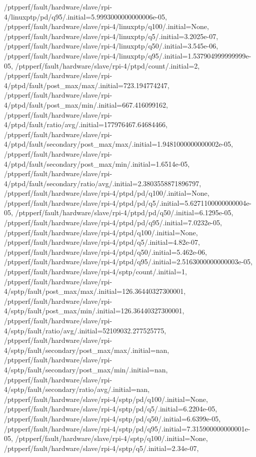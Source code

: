{    /ptpperf/fault/hardware/slave/rpi-4/linuxptp/pd/q95/.initial=5.9993000000000006e-05,
    /ptpperf/fault/hardware/slave/rpi-4/linuxptp/q100/.initial=None,
    /ptpperf/fault/hardware/slave/rpi-4/linuxptp/q5/.initial=3.2025e-07,
    /ptpperf/fault/hardware/slave/rpi-4/linuxptp/q50/.initial=3.545e-06,
    /ptpperf/fault/hardware/slave/rpi-4/linuxptp/q95/.initial=1.537904999999999e-05,
    /ptpperf/fault/hardware/slave/rpi-4/ptpd/count/.initial=2,
    /ptpperf/fault/hardware/slave/rpi-4/ptpd/fault/post_max/max/.initial=723.194774247,
    /ptpperf/fault/hardware/slave/rpi-4/ptpd/fault/post_max/min/.initial=667.416099162,
    /ptpperf/fault/hardware/slave/rpi-4/ptpd/fault/ratio/avg/.initial=177976467.64684466,
    /ptpperf/fault/hardware/slave/rpi-4/ptpd/fault/secondary/post_max/max/.initial=1.9481000000000002e-05,
    /ptpperf/fault/hardware/slave/rpi-4/ptpd/fault/secondary/post_max/min/.initial=1.6514e-05,
    /ptpperf/fault/hardware/slave/rpi-4/ptpd/fault/secondary/ratio/avg/.initial=2.3803558871896797,
    /ptpperf/fault/hardware/slave/rpi-4/ptpd/pd/q100/.initial=None,
    /ptpperf/fault/hardware/slave/rpi-4/ptpd/pd/q5/.initial=5.6271100000000004e-05,
    /ptpperf/fault/hardware/slave/rpi-4/ptpd/pd/q50/.initial=6.1295e-05,
    /ptpperf/fault/hardware/slave/rpi-4/ptpd/pd/q95/.initial=7.0232e-05,
    /ptpperf/fault/hardware/slave/rpi-4/ptpd/q100/.initial=None,
    /ptpperf/fault/hardware/slave/rpi-4/ptpd/q5/.initial=4.82e-07,
    /ptpperf/fault/hardware/slave/rpi-4/ptpd/q50/.initial=5.462e-06,
    /ptpperf/fault/hardware/slave/rpi-4/ptpd/q95/.initial=2.5163000000000003e-05,
    /ptpperf/fault/hardware/slave/rpi-4/sptp/count/.initial=1,
    /ptpperf/fault/hardware/slave/rpi-4/sptp/fault/post_max/max/.initial=126.36440327300001,
    /ptpperf/fault/hardware/slave/rpi-4/sptp/fault/post_max/min/.initial=126.36440327300001,
    /ptpperf/fault/hardware/slave/rpi-4/sptp/fault/ratio/avg/.initial=52109032.277525775,
    /ptpperf/fault/hardware/slave/rpi-4/sptp/fault/secondary/post_max/max/.initial=nan,
    /ptpperf/fault/hardware/slave/rpi-4/sptp/fault/secondary/post_max/min/.initial=nan,
    /ptpperf/fault/hardware/slave/rpi-4/sptp/fault/secondary/ratio/avg/.initial=nan,
    /ptpperf/fault/hardware/slave/rpi-4/sptp/pd/q100/.initial=None,
    /ptpperf/fault/hardware/slave/rpi-4/sptp/pd/q5/.initial=6.2204e-05,
    /ptpperf/fault/hardware/slave/rpi-4/sptp/pd/q50/.initial=6.6399e-05,
    /ptpperf/fault/hardware/slave/rpi-4/sptp/pd/q95/.initial=7.315900000000001e-05,
    /ptpperf/fault/hardware/slave/rpi-4/sptp/q100/.initial=None,
    /ptpperf/fault/hardware/slave/rpi-4/sptp/q5/.initial=2.34e-07,
}
